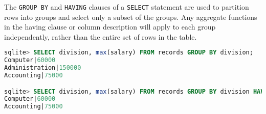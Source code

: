 \vspace{20}
The \texttt{GROUP BY} and \texttt{HAVING} clauses of a \texttt{SELECT} statement are used to partition rows into groups and select only a subset of the groups. Any aggregate functions in the having clause or column description will apply to each group independently, rather than the entire set of rows in the table.

\begin{lstlisting}[language=SQL]
sqlite> SELECT division, max(salary) FROM records GROUP BY division;
Computer|60000
Administration|150000
Accounting|75000

sqlite> SELECT division, max(salary) FROM records GROUP BY division HAVING COUNT(*) > 1;
Computer|60000
Accounting|75000
\end{lstlisting}